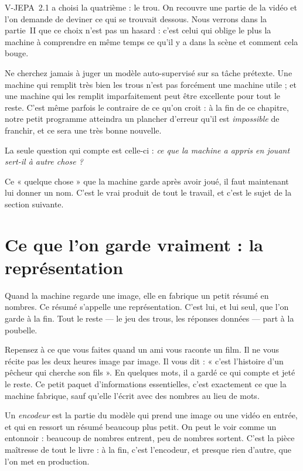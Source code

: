 V-JEPA~2.1 a choisi la quatrième : le trou. On recouvre une partie de la
vidéo et l'on demande de deviner ce qui se trouvait dessous. Nous verrons
dans la partie~II que ce choix n'est pas un hasard : c'est celui qui oblige le
plus la machine à comprendre en même temps ce qu'il y a dans la scène et
comment cela bouge.

\begin{piege}
Ne cherchez jamais à juger un modèle auto-supervisé sur sa tâche prétexte.
Une machine qui remplit très bien les trous n'est pas forcément une machine
utile ; et une machine qui les remplit imparfaitement peut être excellente
pour tout le reste. C'est même parfois le contraire de ce qu'on croit : à la
fin de ce chapitre, notre petit programme atteindra un plancher d'erreur qu'il
est \emph{impossible} de franchir, et ce sera une très bonne nouvelle.

La seule question qui compte est celle-ci : \emph{ce que la machine a appris
en jouant sert-il à autre chose ?}
\end{piege}

Ce « quelque chose » que la machine garde après avoir joué, il faut
maintenant lui donner un nom. C'est le vrai produit de tout le travail, et
c'est le sujet de la section suivante.

\section{Ce que l'on garde vraiment : la représentation}

\begin{enclair}
Quand la machine regarde une image, elle en fabrique un petit résumé en
nombres. Ce résumé s'appelle une représentation. C'est lui, et lui seul, que
l'on garde à la fin. Tout le reste — le jeu des trous, les réponses données —
part à la poubelle.
\end{enclair}

Repensez à ce que vous faites quand un ami vous raconte un film. Il ne vous
récite pas les deux heures image par image. Il vous dit : « c'est l'histoire
d'un pêcheur qui cherche son fils ». En quelques mots, il a gardé ce qui
compte et jeté le reste. Ce petit paquet d'informations essentielles, c'est
exactement ce que la machine fabrique, sauf qu'elle l'écrit avec des nombres
au lieu de mots.

\begin{definition}[L'encodeur][encodeur]
Un \emph{encodeur} est la partie du modèle qui prend une image ou une vidéo
en entrée, et qui en ressort un résumé beaucoup plus petit. On peut le voir
comme un entonnoir : beaucoup de nombres entrent, peu de nombres sortent.
C'est la pièce maîtresse de tout le livre : à la fin, c'est l'encodeur, et
presque rien d'autre, que l'on met en production.
\end{definition}

